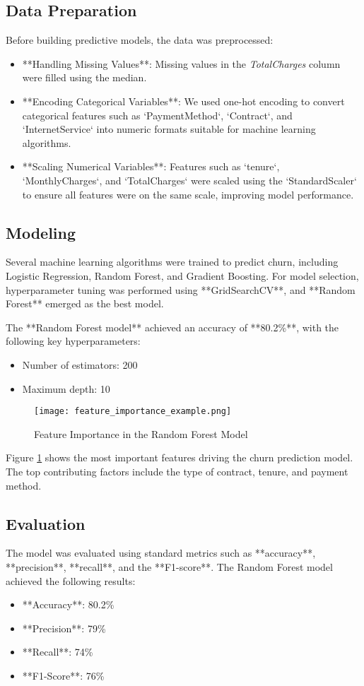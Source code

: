 \documentclass[12pt]{article}
\begin{document}
\subsection{Data Preparation}
Before building predictive models, the data was preprocessed:
\begin{itemize}
    \item **Handling Missing Values**: Missing values in the \textit{TotalCharges} column were filled using the median.
    \item **Encoding Categorical Variables**: We used one-hot encoding to convert categorical features such as `PaymentMethod`, `Contract`, and `InternetService` into numeric formats suitable for machine learning algorithms.
    \item **Scaling Numerical Variables**: Features such as `tenure`, `MonthlyCharges`, and `TotalCharges` were scaled using the `StandardScaler` to ensure all features were on the same scale, improving model performance.
\end{itemize}

\subsection{Modeling}
Several machine learning algorithms were trained to predict churn, including Logistic Regression, Random Forest, and Gradient Boosting. For model selection, hyperparameter tuning was performed using **GridSearchCV**, and **Random Forest** emerged as the best model.

The **Random Forest model** achieved an accuracy of **80.2\%**, with the following key hyperparameters:
\begin{itemize}
    \item Number of estimators: 200
    \item Maximum depth: 10
\end{itemize}

\begin{figure}[H]
    \centering
    \texttt{[image: feature\_importance\_example.png]}
    \caption{Feature Importance in the Random Forest Model}
    \label{fig:feature_importance}
\end{figure}

Figure \ref{fig:feature_importance} shows the most important features driving the churn prediction model. The top contributing factors include the type of contract, tenure, and payment method.

\subsection{Evaluation}
The model was evaluated using standard metrics such as **accuracy**, **precision**, **recall**, and the **F1-score**. The Random Forest model achieved the following results:
\begin{itemize}
    \item **Accuracy**: 80.2\%
    \item **Precision**: 79\%
    \item **Recall**: 74\%
    \item **F1-Score**: 76\%
\end{itemize}
\end{document}
